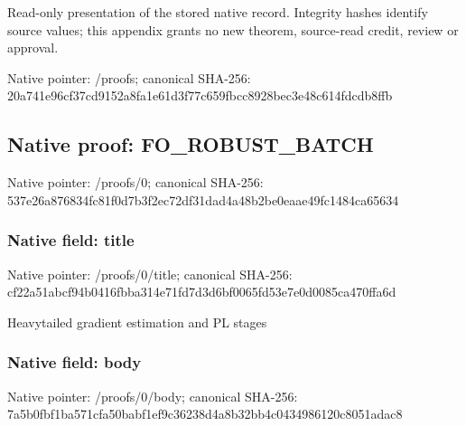 \documentclass[10pt,a4paper]{article}
\begin{document}
Read-only presentation of the stored native record. Integrity hashes identify source values; this appendix grants no new theorem, source-read credit, review or approval.



Native pointer: /proofs; canonical SHA-256: 20a741e96cf37cd9152a8fa1\allowbreak{}e61d3f77c659fbcc8928bec3\allowbreak{}e48c614fdcdb8ffb



\subsection{Native proof: FO\_ROBUST\_BATCH}


Native pointer: /proofs/0; canonical SHA-256: 537e26a876834fc81f0d7b3f\allowbreak{}2ec72df31dad4a48b2be0eaa\allowbreak{}e49fc1484ca65634



\subsubsection{Native field: title}


Native pointer: /proofs/0/title; canonical SHA-256: cf22a51abcf94b0416fbba31\allowbreak{}4e71fd7d3d6bf0065fd53e7e\allowbreak{}0d0085ca470ffa6d


Heavytailed gradient estimation and PL stages


\subsubsection{Native field: body}


Native pointer: /proofs/0/body; canonical SHA-256: 7a5b0fbf1ba571cfa50babf1\allowbreak{}ef9c36238d4a8b32bb4c0434\allowbreak{}986120c8051adac8
\end{document}

